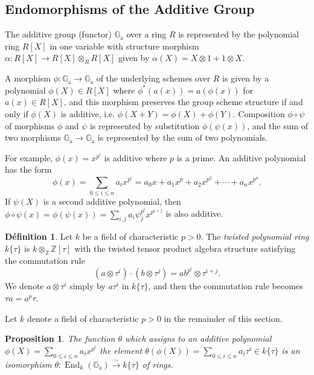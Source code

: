 \documentclass[12pt,a4paper]{article}
\theoremstyle{plain}
\newtheorem{proposition}{Proposition}[section]
\theoremstyle{definition}
\newtheorem{definition}{D\'efinition}[section]
\theoremstyle{remark}
\DeclareMathOperator{\End}{End}
\newcommand{\bZ}{\mathbb{Z}}
\newcommand{\Ga}{\mathbb{G}_\mathrm{a}}
\providecommand{\Ga}{\mathbb{G}_{\mathrm a}}
\providecommand{\End}{\operatorname{End}}
\begin{document}
\subsection{Endomorphisms of the Additive Group}
\label{sec:endomorphisms}

The additive group (functor) $\Ga$ over a ring $R$ is represented by the polynomial ring $R[X]$ in one variable with structure morphism $\alpha: R[X] \to R[X] \otimes_R R[X]$ given by $\alpha(X) = X \otimes 1 + 1 \otimes X$.

A morphism $\phi: \Ga \to \Ga$ of the underlying schemes over $R$ is given by a polynomial $\phi(X) \in R[X]$ where $\phi^*(a(x)) = a(\phi(x))$ for $a(x) \in R[X]$, and this morphism preserves the group scheme structure if and only if $\phi(X)$ is additive, i.e. $\phi(X+Y) = \phi(X) + \phi(Y)$. Composition $\phi \circ \psi$ of morphisms $\phi$ and $\psi$ is represented by substitution $\phi(\psi(x))$, and the sum of two morphisms $\Ga \to \Ga$ is represented by the sum of two polynomials.

For example, $\phi(x) = x^{p^i}$ is additive where $p$ is a prime. An additive polynomial has the form
\[
\phi(x) = \sum_{0 \leq i \leq n} a_i x^{p^i} = a_0 x + a_1 x^p + a_2 x^{p^2} + \cdots + a_n x^{p^n}.
\]
If $\psi(X)$ is a second additive polynomial, then $\phi \circ \psi(x) = \phi(\psi(x)) = \sum_{i,j} a_i \psi_j^{p^i} x^{p^{i+j}}$ is also additive.

\begin{definition}
\label{def:twisted}
Let $k$ be a field of characteristic $p > 0$. The \emph{twisted polynomial ring} $k\{\tau\}$ is $k \otimes_\bZ \bZ[\tau]$ with the twisted tensor product algebra structure satisfying the commutation rule
\[
(a \otimes \tau^i) \cdot (b \otimes \tau^j) = a b^{p^i} \otimes \tau^{i+j}.
\]
We denote $a \otimes \tau^i$ simply by $a\tau^i$ in $k\{\tau\}$, and then the commutation rule becomes $\tau a = a^p \tau$.
\end{definition}

Let $k$ denote a field of characteristic $p > 0$ in the remainder of this section.

\begin{proposition}
\label{prop:endo}
The function $\theta$ which assigns to an additive polynomial $\phi(X) = \sum_{0 \leq i \leq n} a_i x^{p^i}$ the element $\theta(\phi(X)) = \sum_{0 \leq i \leq n} a_i \tau^i \in k\{\tau\}$ is an isomorphism $\theta: \End_k(\Ga) \xrightarrow{\sim} k\{\tau\}$ of rings.
\end{proposition}
\end{document}
